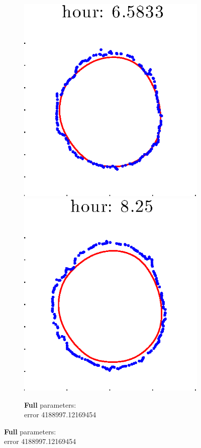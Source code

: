 \documentclass[12pt]{article}
\begin{document}
\begin{figure}[h!]
\begin{subfigure}[b]{.3\textwidth}
		\includegraphics[height=.15\textheight]{Pos0/full/full5.eps}
		\includegraphics[height=.15\textheight]{Pos0/full/full6.eps}
		\caption{\textbf{Full} parameters: \\error 4188997.12169454}

\end{subfigure}
\end{figure}
\end{document}
